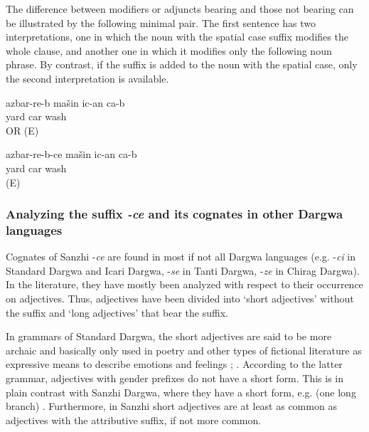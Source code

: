 The difference between modifiers or adjuncts bearing  and those not bearing  can be illustrated by the following minimal pair. The first sentence has two interpretations, one in which the noun with the spatial case suffix modifies the whole clause, and another one in which it modifies only the following noun phrase. By contrast, if the suffix  is added to the noun with the spatial case, only the second interpretation is available.
%
\begin{exe}
	\ex	\label{ex:‎‎The car has to be washed in the yard minor}
	\gll	azbar-re-b	mašin	ic-an	ca-b\\
		yard	car	wash	\\
	\glt	{} OR  (E)

	\ex	\label{ex:‎‎‎The car that is in the yard has to be washed minor}
	\gll	azbar-re-b-ce	mašin	ic-an	ca-b\\
		yard	car	wash	\\
	\glt	{} (E)
\end{exe}


\subsubsection{Analyzing the suffix \textit{-ce} and its cognates in other Dargwa languages}
\label{sssec:Analyzing the suffix -ce and its cognates in other Dargwa languages}

Cognates of Sanzhi -\textit{ce} are found in most if not all Dargwa languages (e.g. -\textit{ci} in Standard Dargwa and Icari Dargwa, -\textit{se} in Tanti Dargwa, -\textit{ze} in Chirag Dargwa). In the literature, they have mostly been analyzed with respect to their occurrence on adjectives. Thus, adjectives have been divided into `short adjectives' without the suffix and `long adjectives' that bear the suffix.

In grammars of Standard Dargwa, the short adjectives are said to be more archaic and basically only used in poetry and other types of fictional literature as expressive means to describe emotions and feelings \citep[26]{vandenBerg2001}; \citep[207]{Abdullaev2014}. According to the latter grammar, adjectives with gender prefixes do not have a short form. This is in plain contrast with Sanzhi Dargwa, where they have a short form, e.g.  (one long branch) . Furthermore, in Sanzhi short adjectives are at least as common as adjectives with the attributive suffix, if not more common.

